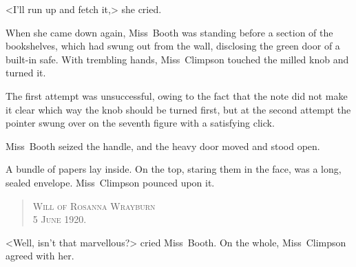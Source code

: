 <I'll run up and fetch it,> she cried.

When she came down again, Miss~Booth was standing before a section of the bookshelves, which had swung out from the wall, disclosing the green door of a built-in safe. With trembling hands, Miss~Climpson touched the milled knob and turned it.

The first attempt was unsuccessful, owing to the fact that the note did not make it clear which way the knob should be turned first, but at the second attempt the pointer swung over on the seventh figure with a satisfying click.

Miss~Booth seized the handle, and the heavy door moved and stood open.

A bundle of papers lay inside. On the top, staring them in the face, was a long, sealed envelope. Miss~Climpson pounced upon it.


\begin{quote}\centering\scshape
Will of Rosanna Wrayburn\\
5 June 1920.
\end{quote}

<Well, isn't that marvellous?> cried Miss~Booth. On the whole, Miss~Climpson agreed with her.